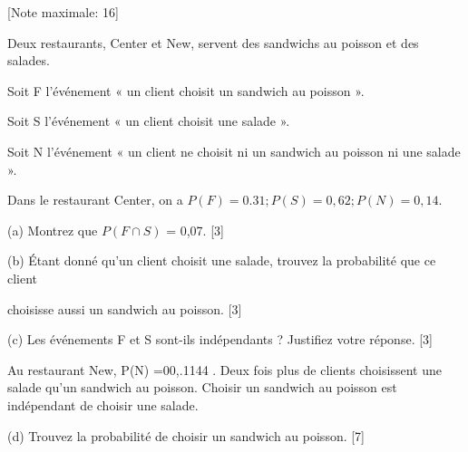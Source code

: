 \begin{question}
  \hspace*{\fill} [Note maximale: 16]\par
  \medskip

  \noindent Deux restaurants, Center et New, servent des sandwichs au poisson et des salades.\par
  \medskip
  \noindent Soit F l’événement « un client choisit un sandwich au poisson ».\par
  \noindent Soit S l’événement « un client choisit une salade ».\par
  \noindent Soit N l’événement « un client ne choisit ni un sandwich au poisson ni une salade ».\par
  \medskip
  \noindent Dans le restaurant Center, on a $P(F) = 0.31; P(S) = 0,62 ; P(N) = 0,14$.\par
  \medskip
  (a) Montrez que $P(F \cap S)$ = 0,07.\hspace*{\fill} [3]\par
  \medskip
  (b) Étant donné qu’un client choisit une salade, trouvez la probabilité que ce client\par
  \hspace{2em}choisisse aussi un sandwich au poisson.\hspace*{\fill} [3]\par
  \medskip
  (c) Les événements F et S sont-ils indépendants ? Justifiez votre réponse.\hspace*{\fill} [3]\par
  \medskip
  \noindent Au restaurant New, P(N) =00,.1144 . Deux fois plus de clients choisissent une salade qu’un sandwich au poisson. Choisir un sandwich au poisson est indépendant de choisir une salade.\par
  \medskip
  (d) Trouvez la probabilité de choisir un sandwich au poisson.\hspace*{\fill} [7]\par
  
\end{question}

